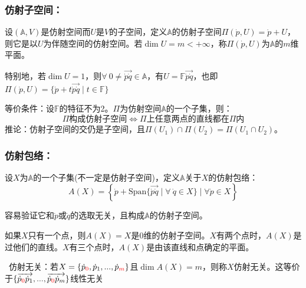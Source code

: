 \documentclass[zihao=5,UTF8]{report}
\def\F{\mathbb{F}}
\def\A{\mathbb{A}}
\theoremstyle{mystyle} %
\begin{document}
\subsubsection{仿射子空间：}
设$(\A,V)$是仿射空间而$U$是$V$的子空间，定义$\A$的仿射子空间$\Pi(\dot{p},U) = \dot{p} + U$，则它是以$U$为伴随空间的仿射空间。若$\dim U = m< +\infty$，称$\Pi(\dot{p},U)$为$\A$的$m$维平面。\par
特别地，若$\dim U = 1$，则$\forall\  0 \ne\overrightarrow{\dot{p}\dot{q}} \in \A$，有$U = \F\overrightarrow{\dot{p}\dot{q}}$，也即$\Pi (\dot{p},U) =\{\dot{p} + t\overrightarrow{\dot{p}\dot{q}}\mid t \in \F\} $

等价条件：设$\F$的特征不为2。$\Pi$为仿射空间$\A$的一个子集，则：
\begin{equation*}
    \text{$\Pi$构成仿射子空间} \Longleftrightarrow \text{$\Pi$上任意两点的直线都在$\Pi$内}
\end{equation*}
推论：仿射子空间的交仍是子空间，且$\Pi(U_1)\cap\Pi(U_2) = \Pi(U_1\cap U_2)$。


\subsubsection{仿射包络：}
设$X$为$\A$的一个子集(不一定是仿射子空间)，定义$\A$关于$X$的仿射包络：
\begin{equation*}
    A(X) = \left\{  \dot{p} +\text{Span}\{\overrightarrow{\dot{p}\dot{q}}\mid\forall\  \dot{q} \in X\}\mid \forall \dot{p}\in X \right\}
\end{equation*}

容易验证它和$\dot{p}$或$\dot{q}$的选取无关，且构成$\A$的仿射子空间。\par
如果$X$只有一个点，则$A(X)=X$是0维的仿射子空间。$X$有两个点时，$A(X)$是过他们的直线。$X$有三个点时，$A(X)$是由该直线和点确定的平面。
\par{}\ 仿射无关：若$X = \{\dot{p}_{\textcolor{red}{0}},\dot{p}_1,...,\dot{p}_{\textcolor{red}{m}}\}$且$\dim A(X) = m$，则称$X$仿射无关。这等价于$\{\overrightarrow{\dot{p}_{\textcolor{red}{0}}\dot{p}_1},...,\overrightarrow{\dot{p}_{\textcolor{red}{0}}\dot{p}_m}  \}$线性无关    \par
\end{document}
